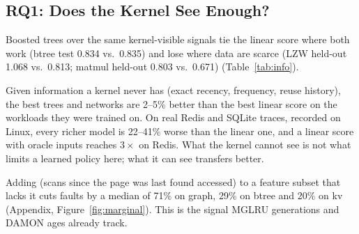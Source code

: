 \subsection{RQ1: Does the Kernel See Enough?}
\label{sec:eval-info}

 Boosted trees over the
same kernel-visible signals tie the linear score where both work (btree test 0.834 vs.\
0.835) and lose where data are scarce (LZW held-out 1.068 vs.\ 0.813; matmul held-out
0.803 vs.\ 0.671) (Table~\ref{tab:info}).

 Given information a kernel never
has (exact recency, frequency, reuse history), the best trees and networks are 2--5\%
better than the best linear score on the workloads they were trained on. On real Redis
and SQLite traces, recorded on Linux, every richer model is 22--41\% worse than the
linear one, and a linear score with oracle inputs reaches $3\times$ \clock on Redis.
What the kernel cannot see is not what limits a learned policy here; what it can see
transfers better.

 Adding  (scans since the page was
last found accessed) to a feature subset that lacks it cuts faults by a median of 71\% on
graph, 29\% on btree and 20\% on kv (Appendix, Figure~\ref{fig:marginal}). This is the signal MGLRU
generations and DAMON ages already track.

